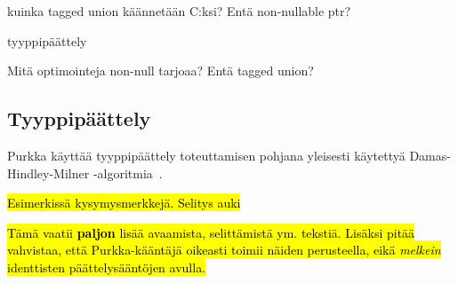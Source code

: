 kuinka tagged union käännetään C:ksi? Entä non-nullable ptr?

tyyppipäättely

Mitä optimointeja non-null tarjoaa? Entä tagged union?

\subsection{Tyyppipäättely}

Purkka käyttää tyyppipäättely toteuttamisen pohjana yleisesti käytettyä
Damas-Hindley-Milner -algoritmia~\citep{hindley, milner, damas}.

\FloatBarrier

\hl {Esimerkissä kysymysmerkkejä. Selitys auki}

\hl{Tämä vaatii \textbf{paljon} lisää avaamista, selittämistä ym. tekstiä.
Lisäksi pitää vahvistaa, että Purkka-kääntäjä oikeasti toimii näiden
perusteella, eikä \emph{melkein} identtisten päättelysääntöjen avulla.}

\newcommand{\hmtag}[1]{\tag*{[#1]\hspace*{1cm}}}

